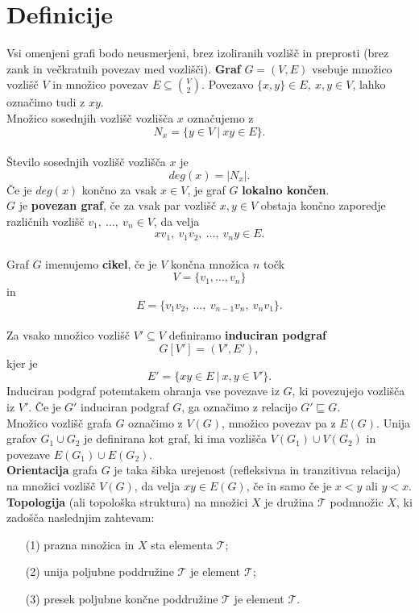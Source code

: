 \documentclass[a4paper, 12pt]{book}
\theoremstyle{definition}
\theoremstyle{remark}
\begin{document}
\section{Definicije}
Vsi omenjeni grafi bodo neusmerjeni, brez izoliranih vozlišč in preprosti (brez zank
in večkratnih povezav med vozlišči).
\textbf{Graf} $G = (V,E)$ vsebuje množico vozlišč $V$ in množico povezav $E \subseteq \binom{V}{2}$.
Povezavo $\{x,y\} \in E,\ x,y \in V$, lahko označimo tudi z $xy$.\\
Množico sosednjih vozlišč vozlišča $x$ označujemo z \[N_x = \{y \in V\ |\ xy \in E\}.\]\\
Število sosednjih vozlišč vozlišča $x$ je \[deg(x) = |N_x|.\] Če je $deg(x)$ končno
za vsak $x \in V$, je graf $G$ \textbf{lokalno končen}.\\
$G$ je \textbf{povezan graf}, če za vsak par vozlišč $x,y \in V$ obstaja končno
zaporedje različnih vozlišč $v_1,\ \dots,\ v_n \in V$, da velja \[xv_1,\ v_1v_2,\ \dots,\ v_n y \in E.\]\\
Graf $G$ imenujemo \textbf{cikel}, če je $V$ končna množica $n$ točk \[V=\{v_1,\dots,v_n\}\] in
\[E=\{v_1 v_2,\ \dots,\ v_{n-1}v_n,\ v_n v_1\}.\] \\
Za vsako množico vozlišč $V' \subseteq V$ definiramo \textbf{induciran podgraf} \[G[V'] = (V',E'),\]
kjer je \[E' = \{xy \in E\ |\ x,y \in V'\}.\] Induciran podgraf potemtakem ohranja vse povezave
iz $G$, ki povezujejo vozlišča iz $V'$. Če je $G'$ induciran podgraf $G$,
ga označimo z relacijo $G' \sqsubseteq  G$.\\
Množico vozlišč grafa $G$ označimo z $V(G)$, množico povezav pa z $E(G)$. Unija
grafov $G_1 \cup G_2$ je definirana kot graf, ki ima vozlišča $V(G_1) \cup V(G_2)$
in povezave $E(G_1) \cup E(G_2)$.\\
\textbf{Orientacija} grafa $G$ je taka šibka urejenost (refleksivna in tranzitivna relacija)
na množici vozlišč $V(G)$, da velja $xy \in E(G)$, če in samo če je $x < y$ ali $y < x$.
\textbf{Topologija} (ali topološka struktura) na množici $X$ je družina $\mathcal{T}$ podmnožic
$X$, ki zadošča naslednjim zahtevam:
\begin{itemize}
    \item[(1)] prazna množica in $X$ sta elementa $\mathcal{T}$;
    \item[(2)] unija poljubne poddružine $\mathcal{T}$ je element $\mathcal{T}$;
    \item[(3)] presek poljubne končne poddružine $\mathcal{T}$ je element $\mathcal{T}$.
\end{itemize}
\end{document}
